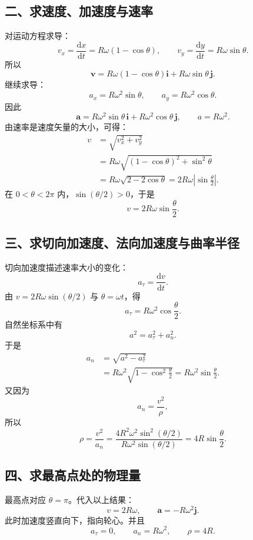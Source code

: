 \documentclass[11pt,a4paper]{ctexart}
\newcommand{\dd}{\mathrm{d}}
\newcommand{\ii}{\bm{i}}
\newcommand{\jj}{\bm{j}}
\begin{document}
\subsection*{二、求速度、加速度与速率}

对运动方程求导：
\[
  v_x=\frac{\dd x}{\dd t}=R\omega(1-\cos\theta),
  \qquad
  v_y=\frac{\dd y}{\dd t}=R\omega\sin\theta.
\]
所以
\[
  \boxed{\bm v=R\omega(1-\cos\theta)\ii+R\omega\sin\theta\,\jj.}
\]
继续求导：
\[
  a_x=R\omega^2\sin\theta,
  \qquad
  a_y=R\omega^2\cos\theta.
\]
因此
\[
  \boxed{\bm a=R\omega^2\sin\theta\,\ii+R\omega^2\cos\theta\,\jj,}
  \qquad
  \boxed{a=R\omega^2.}
\]
由速率是速度矢量的大小，可得：
\[
\begin{aligned}
  v&=\sqrt{v_x^2+v_y^2}  \\
   &=R\omega\sqrt{(1-\cos\theta)^2+\sin^2\theta} \\
   &=R\omega\sqrt{2-2\cos\theta}
    =2R\omega\left|\sin\frac{\theta}{2}\right|.
\end{aligned}
\]
在 $0<\theta<2\pi$ 内，$\sin(\theta/2)>0$，于是
\[
  \boxed{v=2R\omega\sin\frac{\theta}{2}.}
\]

\subsection*{三、求切向加速度、法向加速度与曲率半径}

切向加速度描述速率大小的变化：
\[
  a_\tau=\frac{\dd v}{\dd t}.
\]
由 $v=2R\omega\sin(\theta/2)$ 与 $\theta=\omega t$，得
\[
  \boxed{a_\tau=R\omega^2\cos\frac{\theta}{2}.}
\]
自然坐标系中有
\[
  a^2=a_\tau^2+a_n^2.
\]
于是
\[
\begin{aligned}
  a_n&=\sqrt{a^2-a_\tau^2}  \\
     &=R\omega^2\sqrt{1-\cos^2\frac{\theta}{2}}
      =\boxed{R\omega^2\sin\frac{\theta}{2}}.
\end{aligned}
\]
又因为
\[
  a_n=\frac{v^2}{\rho},
\]
所以
\[
  \rho=\frac{v^2}{a_n}
  =\frac{4R^2\omega^2\sin^2(\theta/2)}{R\omega^2\sin(\theta/2)}
  =\boxed{4R\sin\frac{\theta}{2}}.
\]

\subsection*{四、求最高点处的物理量}

最高点对应 $\theta=\pi$。代入以上结果：
\[
  \boxed{v=2R\omega,}
  \qquad
  \boxed{\bm a=-R\omega^2\jj.}
\]
此时加速度竖直向下，指向轮心。并且
\[
  \boxed{a_\tau=0,\qquad a_n=R\omega^2,
  \qquad \rho=4R.}
\]
\end{document}
